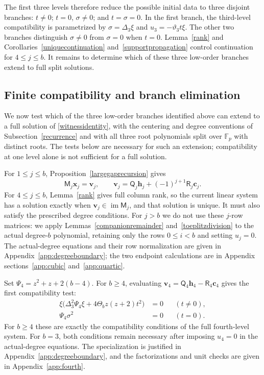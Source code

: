 \documentclass[10pt,a4paper]{amsart}
\newcommand{\F}{\mathbb{F}_p}
\begin{document}
The first three levels therefore reduce the possible initial data to
three disjoint branches: $t\ne0$; $t=0$, $\sigma\ne0$; and
$t=\sigma=0$.  In the first branch, the third-level compatibility is
parametrized by $\sigma=\Delta_3\xi$ and $u_3=-\vartheta_3t\xi$.
The other two branches distinguish $\sigma\ne0$ from $\sigma=0$ when
$t=0$.
Lemma~\ref{rank} and Corollaries~\ref{uniquecontinuation}
and~\ref{supportpropagation} control continuation for $4\le j\le b$.  It remains to determine which of these three low-order branches
extend to full split solutions.

\subsection{Finite compatibility and branch elimination}\label{eliminationdetails}

We now test which of the three low-order branches identified above
can extend to a full solution of \eqref{witnessidentity}, with the
centering and degree conventions of Subsection~\ref{recurrence} and
with all three root polynomials split over $\F$ with distinct roots.
The tests below are necessary for such an extension; compatibility at
one level alone is not sufficient for a full solution.

For $1\le j\le b$, Proposition~\ref{largegaprecursion} gives
\[
 \mathsf M_j\mathbf x_j=\mathbf v_j,
 \qquad
 \mathbf v_j=\mathsf Q_j\mathbf h_j+(-1)^{j+1}\mathsf R_j\mathbf c_j.
\]
For $4\le j\le b$, Lemma~\ref{rank} gives full column rank, so the
current linear system has a solution exactly when
$\mathbf v_j\in\operatorname{im}\mathsf M_j$, and that solution is
unique.  It must also satisfy the prescribed degree conditions.
For $j>b$ we do not use these $j$-row matrices: we apply
Lemmas~\ref{companionremainder} and~\ref{toeplitzdivision} to the actual
degree-$b$ polynomial, retaining only the rows $0\le i<b$ and setting
$u_j=0$.  The actual-degree equations and their row normalization are
given in Appendix~\ref{app:degreeboundary}; the two endpoint calculations
are in Appendix sections~\ref{app:cubic} and~\ref{app:quartic}.

Set $\Psi_4=z^2+z+2(b-4)$.  For $b\ge4$, evaluating
$\mathbf v_4=\mathsf Q_4\mathbf h_4-\mathsf R_4\mathbf c_4$ gives the
first compatibility test:
\begin{align}
 \xi\bigl(\Delta_3^2\Psi_4\xi+4\Theta_bz(z+2)t^2\bigr)&=0
                       &&(t\ne0),\label{mregfourthnonzero}\\
 \Psi_4\sigma^2&=0&&(t=0).\label{mregfourthzero}
\end{align}
For $b\ge4$ these are exactly the compatibility conditions of the full
fourth-level system.  For $b=3$, both conditions remain necessary after
imposing $u_4=0$ in the actual-degree equations.  The specialization is
justified in Appendix~\ref{app:degreeboundary}, and the factorizations
and unit checks are given in Appendix~\ref{app:fourth}.
\end{document}
